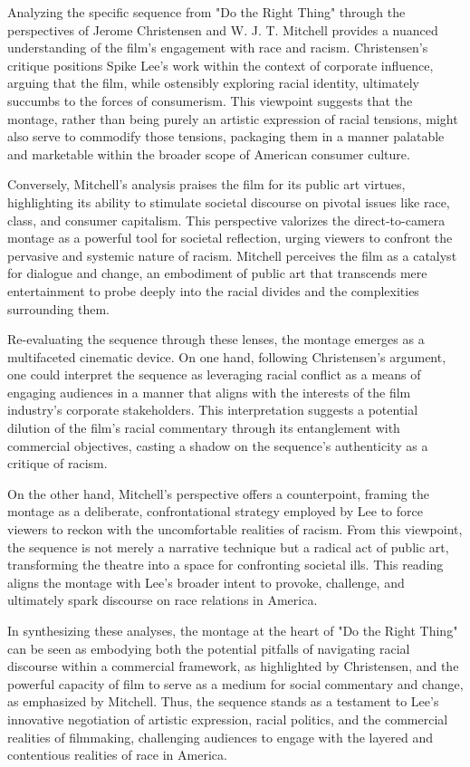 \documentclass[12pt]{article}
\begin{document}
Analyzing the specific sequence from "Do the Right Thing" through the perspectives of Jerome Christensen and W. J. T. Mitchell provides a nuanced understanding of the film's engagement with race and racism. Christensen's critique positions Spike Lee's work within the context of corporate influence, arguing that the film, while ostensibly exploring racial identity, ultimately succumbs to the forces of consumerism​​. This viewpoint suggests that the montage, rather than being purely an artistic expression of racial tensions, might also serve to commodify those tensions, packaging them in a manner palatable and marketable within the broader scope of American consumer culture.

Conversely, Mitchell's analysis praises the film for its public art virtues, highlighting its ability to stimulate societal discourse on pivotal issues like race, class, and consumer capitalism​​. This perspective valorizes the direct-to-camera montage as a powerful tool for societal reflection, urging viewers to confront the pervasive and systemic nature of racism. Mitchell perceives the film as a catalyst for dialogue and change, an embodiment of public art that transcends mere entertainment to probe deeply into the racial divides and the complexities surrounding them.

Re-evaluating the sequence through these lenses, the montage emerges as a multifaceted cinematic device. On one hand, following Christensen's argument, one could interpret the sequence as leveraging racial conflict as a means of engaging audiences in a manner that aligns with the interests of the film industry's corporate stakeholders. This interpretation suggests a potential dilution of the film's racial commentary through its entanglement with commercial objectives, casting a shadow on the sequence's authenticity as a critique of racism.

On the other hand, Mitchell's perspective offers a counterpoint, framing the montage as a deliberate, confrontational strategy employed by Lee to force viewers to reckon with the uncomfortable realities of racism. From this viewpoint, the sequence is not merely a narrative technique but a radical act of public art, transforming the theatre into a space for confronting societal ills. This reading aligns the montage with Lee's broader intent to provoke, challenge, and ultimately spark discourse on race relations in America.

In synthesizing these analyses, the montage at the heart of "Do the Right Thing" can be seen as embodying both the potential pitfalls of navigating racial discourse within a commercial framework, as highlighted by Christensen, and the powerful capacity of film to serve as a medium for social commentary and change, as emphasized by Mitchell. Thus, the sequence stands as a testament to Lee's innovative  negotiation of artistic expression, racial politics, and the commercial realities of filmmaking, challenging audiences to engage with the layered and contentious realities of race in America.
\end{document}
